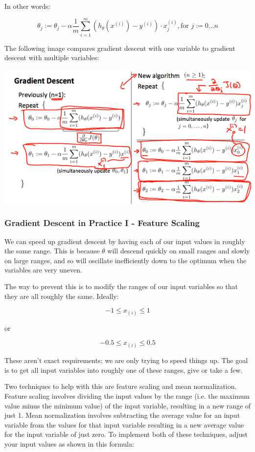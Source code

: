 \documentclass[UTF8]{article}
\begin{document}
In other words:

\[ \theta_j := \theta_j - \alpha \frac{1}{m} \sum\limits_{i=1}^{m} (h_\theta(x^{(i)}) - y^{(i)}) \cdot x_j^{(i)}, \text{for } j := 0...n \]

The following image compares gradient descent with one variable to gradient descent with multiple variables:

\includegraphics[width = \textwidth]{NotePics/4_2_1.png}

\subsubsection{Gradient Descent in Practice I - Feature Scaling}

We can speed up gradient descent by having each of our input values in roughly the same range. This is because $\theta$ will descend quickly on small ranges and slowly on large ranges, and so will oscillate inefficiently down to the optimum when the variables are very uneven.

The way to prevent this is to modify the ranges of our input variables so that they are all roughly the same. Ideally:

\[-1 \le x_{(i)} \le 1\]

or

\[ -0.5 \le x_{(i)} \le 0.5 \]

These aren't exact requirements; we are only trying to speed things up. The goal is to get all input variables into roughly one of these ranges, give or take a few.

Two techniques to help with this are feature scaling and mean normalization. Feature scaling involves dividing the input values by the range (i.e. the maximum value minus the minimum value) of the input variable, resulting in a new range of just 1. Mean normalization involves subtracting the average value for an input variable from the values for that input variable resulting in a new average value for the input variable of just zero. To implement both of these techniques, adjust your input values as shown in this formula:
\end{document}
